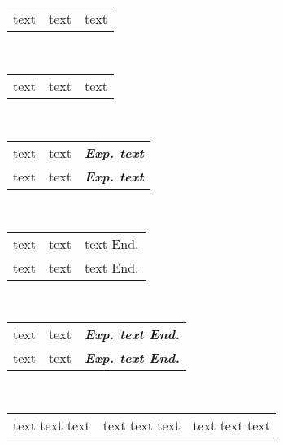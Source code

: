\documentclass[a4paper, 12pt]{article}
\begin{document}

    \begin{tabular}{|p{2cm}|m{3cm}|b{4cm}|}
        text & text & text
    \end{tabular}\\

    \begin{tabular}{|p{2cm}|m{3cm}|c|} %
        text & text & text
    \end{tabular}\\

    \begin{tabular}{|p{2cm}|m{3cm}|>{\bfseries \itshape Exp. }c|} %
        text & text & text\\
        text & text & text
    \end{tabular}\\

    \begin{tabular}{|p{2cm}|m{3cm}|c<{ End.}|} %
        text & text & text\\
        text & text & text
    \end{tabular}\\

    \begin{tabular}{|p{2cm}|m{3cm}|>{\bfseries \itshape Exp. }c<{ End.}|} %
        text & text & text\\
        text & text & text
    \end{tabular}\\

    \begin{tabularx}{\textwidth}{|X|X|X|}
        text text text & text text text & text text text
    \end{tabularx}\\
\end{document}

